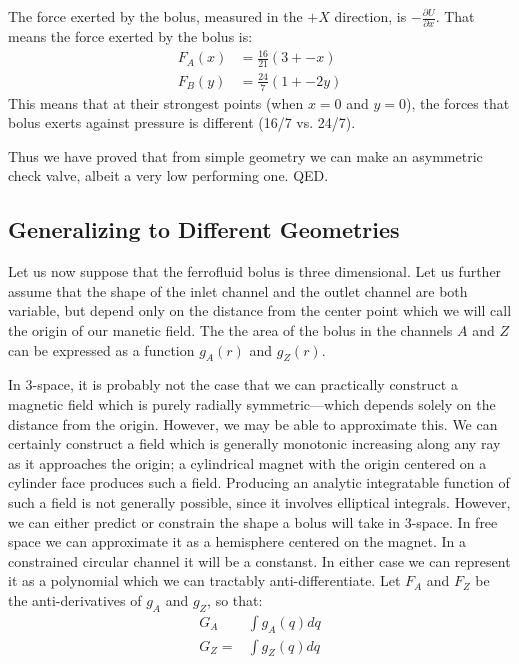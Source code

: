 \documentclass{asme2ej}
\begin{document}
The force exerted by the bolus, measured in the $+X$ direction, is $-\frac{\partial U}{\partial x}$.
That means the force exerted by the bolus is:
\begin{align}
  F_A(x) &= \frac{16}{21} (3 + -x) \\
  F_B(y) &= \frac{24}{7} (1 + -2 y)
\end{align}
This means that at their strongest points (when $x = 0$ and $y =0$), the
forces that bolus exerts against pressure is different (16/7 vs. 24/7).

Thus we have proved that from simple geometry we can make an asymmetric
check valve, albeit a very low performing one.
QED.

\subsection{Generalizing to Different Geometries}

Let us now suppose that the ferrofluid bolus is three dimensional.
Let us further assume that the shape of the inlet channel and
the outlet channel are both variable, but depend only on the distance
from the center point which we will call the origin of our manetic
field.
The the area of the bolus in the channels $A$ and $Z$ can be expressed
as a function $g_A(r)$ and $g_Z(r)$.

In 3-space, it is probably not the case that we can practically construct a
magnetic field which is purely radially symmetric---which depends solely on
the distance from the origin. However, we may be able to
approximate this. We can certainly construct a field which is
generally monotonic increasing along any ray as it approaches the origin;
a cylindrical magnet with the origin centered on a cylinder face produces
such a field. Producing an analytic integratable function of such
a field is not generally possible, since it involves elliptical integrals.
However, we can either predict or constrain the shape a bolus will take
in 3-space. In free space we can approximate it as a hemisphere centered
on the magnet. In a constrained circular channel it will be a constanst.
In either case we can represent it as a polynomial which we can
tractably anti-differentiate. Let $F_A$ and $F_Z$ be the anti-derivatives
of $g_A$ and $g_Z$, so that:
\begin{align}
  G_A &\int g_A(q) dq \\
  G_Z = & \int g_Z(q) dq \\
\end{align}
\end{document}
